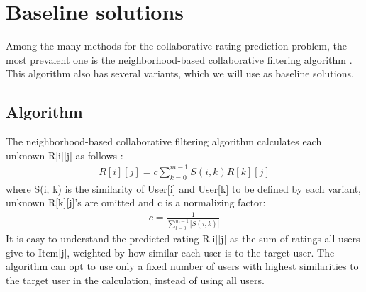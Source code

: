 \documentclass[letterpaper]{article}
\begin{document}
\section{Baseline solutions}
Among the many methods for the collaborative rating prediction problem,
the most prevalent one is the neighborhood-based collaborative filtering 
algorithm \cite{su2009survey}.
This algorithm also has several variants,
which we will use as baseline solutions.

\subsection{Algorithm}
The neighborhood-based collaborative filtering algorithm calculates each 
unknown R[i][j] as 
follows \cite{su2009survey}:
\begin{align*}
R[i][j] = c \sum_{k = 0}^{m-1} S(i, k) R[k][j]
\end{align*}
where S(i, k) is the similarity of User[i] and User[k] to be defined by each 
variant,
unknown R[k][j]'s are omitted and c is a normalizing factor:
\begin{align*}
	c = \frac{1}{\sum_{l = 0}^{m - 1} |S(i, k)|}
\end{align*}
It is easy to understand the predicted rating R[i][j] as the sum of ratings all 
users give to Item[j],
weighted by how similar each user is to the target user.
The algorithm can opt to use only a fixed number of users with highest 
similarities to the target user in the calculation, instead of using all users.
\end{document}
